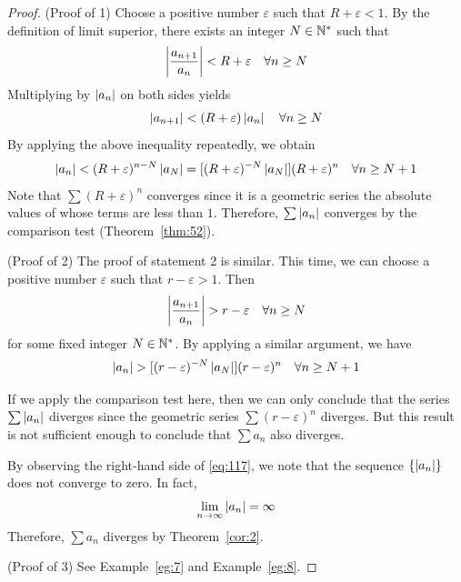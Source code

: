 \documentclass[thmcnt=section, 12pt]{my-elegantbook}
\begin{document}
\begin{proof}
    (Proof of 1) Choose a positive number $\varepsilon$ such that $R + \varepsilon < 1$. By the definition of limit superior, there exists an integer $N \in \mathbb{N}^\ast$ such that 
    \begin{align*}
        \left\lvert \frac{a_{n+1}}{a_n} \right\rvert < R + \varepsilon
        \quad \forall n \geq N
    \end{align*}
    Multiplying by $\left\lvert a_n \right\rvert$ on both sides yields
    \begin{align*}
        \left\lvert a_{n+1} \right\rvert < (R + \varepsilon) \left\lvert a_n \right\rvert
        \quad \forall n \geq N
    \end{align*}
    By applying the above inequality repeatedly, we obtain
    \begin{align*}
        \left\lvert a_n \right\rvert < (R+\varepsilon)^{n-N} \left\lvert a_N \right\rvert
        = [(R+\varepsilon)^{-N} \left\lvert a_N \right\rvert] (R+\varepsilon)^n 
        \quad \forall n \geq N+1
    \end{align*}
    Note that $\sum (R+\varepsilon)^n$ converges since it is a geometric series the absolute values of whose terms are less than $1$. Therefore, $\sum \left\lvert a_n \right\rvert$ converges by the comparison test (Theorem~\ref{thm:52}).

    (Proof of 2) The proof of statement 2 is similar. This time, we can choose a positive number $\varepsilon$ such that $r-\varepsilon > 1$. Then 
    \begin{align*}
        \left\lvert \frac{a_{n+1}}{a_n} \right\rvert > r - \varepsilon
        \quad \forall n \geq N
    \end{align*}
    for some fixed integer $N \in \mathbb{N}^\ast$. By applying a similar argument, we have 
    \begin{align}
        \left\lvert a_n \right\rvert > [(r-\varepsilon)^{-N} \left\lvert a_N \right\rvert] (r-\varepsilon)^n 
        \quad \forall n \geq N+1
        \label{eq:117}
    \end{align}
    \begin{note}
        If we apply the comparison test here, then we can only conclude that the series $\sum \left\lvert a_n \right\rvert$ diverges since the geometric series $\sum (r-\varepsilon)^n$ diverges. But this result is not sufficient enough to conclude that $\sum a_n$ also diverges.
    \end{note}
    \noindent By observing the right-hand side of \eqref{eq:117}, we note that the sequence $\{\left\lvert a_n \right\rvert\}$ does not converge to zero. In fact, 
    \begin{align*}
        \lim_{n \to \infty} \left\lvert a_n \right\rvert = \infty
    \end{align*}
    Therefore, $\sum a_n$ diverges by Theorem~\ref{cor:2}.

    (Proof of 3) See Example~\ref{eg:7} and Example~\ref{eg:8}.
\end{proof}
\end{document}
